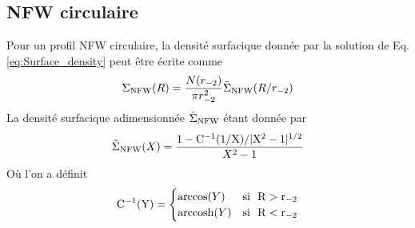 \documentclass[a4paper,11pt]{article}
\numberwithin{equation}{section}
\DeclareMathOperator{\arccosh}{arccosh}
\begin{document}
  \subsection{NFW circulaire}
	  Pour un profil NFW circulaire, la densité surfacique donnée par la solution de Eq.\ref{eq:Surface_density} peut être écrite comme	
  	\begin{equation}
  	  \label{eq:NFW_tilde_tronque}
  		\Sigma_{\rm{NFW}} (R) = \frac{N(r_{-2})}{\pi r_{-2}^2} \tilde{\Sigma}_{\rm{NFW}} (R/r_{-2})
  	\end{equation}
  	La densité surfacique adimensionnée $\tilde{\Sigma}_{\rm{NFW}}$ étant donnée par \cite{Lokas2001}
    \begin{equation}
    	\tilde{\Sigma}_{\rm{NFW}} (X) =  \frac{1 - \rm{C}^{-1} (1/X)/ | X^2 -1 |^{1/2} }{X^2 -1}
    \end{equation}  
    Où l'on a définit
    \begin{equation}
    	\rm{C}^{-1}(Y) = 
    	\begin{cases}  	
    	 	\arccos(Y) & \rm{si} \ \ R>r_{-2}\\
   	  	\arccosh(Y) & \rm{si} \ \ R<r_{-2}
    	\end{cases}
    \end{equation}
  
\end{document}

